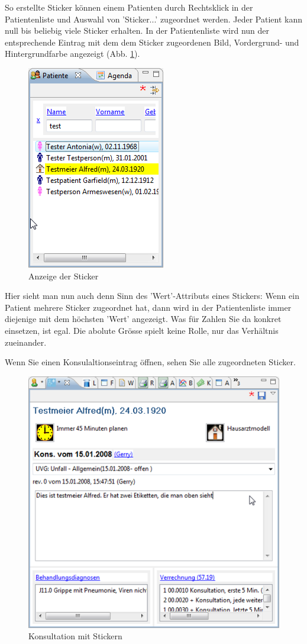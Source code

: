 So erstellte Sticker können einem Patienten durch Rechtsklick in der Patientenliste und Auswahl von 'Sticker...' zugeordnet werden. Jeder Patient kann null bis beliebig viele Sticker erhalten. In der Patientenliste wird nun der entsprechende Eintrag mit dem dem Sticker zugeordenen Bild, Vordergrund- und Hintergrundfarbe angezeigt (Abb. \ref{fig:etiketten2}).
\begin{figure}
    \includegraphics{images/etikette3}
    \caption{Anzeige der Sticker}
    \label{fig:etiketten2}
\end{figure}

Hier sieht man nun auch denn Sinn des 'Wert'-Attributs eines Stickers: Wenn ein Patient mehrere Sticker zugeordnet hat, dann wird in der Patientenliste immer diejenige mit dem höchsten 'Wert' angezeigt. Was für Zahlen Sie da konkret einsetzen, ist egal. Die abolute Grösse spielt keine Rolle, nur das Verhältnis zueinander.

\medskip

Wenn Sie einen Konsulaltionseintrag öffnen, sehen Sie alle zugeordneten Sticker.
\begin{figure}
    \includegraphics{images/etikette2}
    \caption{Konsultation mit Stickern}
    \label{fig:etiketten3}
\end{figure}


